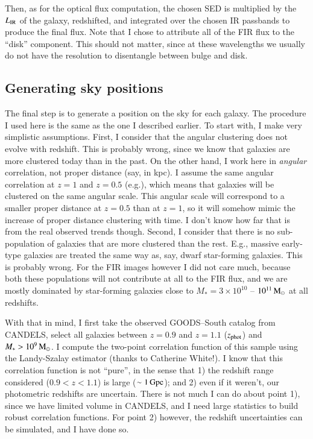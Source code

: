 \documentclass[12pt,a4paper]{article}
\newcommand{\lir}{L_{\rm IR}}
\newcommand{\msun}{{\rm M}_\odot}
\newcommand{\mstar}{M_\ast}
\begin{document}
Then, as for the optical flux computation, the chosen SED is multiplied by the $\lir$ of the galaxy, redshifted, and integrated over the chosen IR passbands to produce the final flux. Note that I chose to attribute all of the FIR flux to the ``disk'' component. This should not matter, since at these wavelengths we usually do not have the resolution to disentangle between bulge and disk.


\subsection{Generating sky positions}

The final step is to generate a position on the sky for each galaxy. The procedure I used here is the same as the one I described earlier. To start with, I make very simplistic assumptions. First, I consider that the angular clustering does not evolve with redshift. This is probably wrong, since we know that galaxies are more clustered today than in the past. On the other hand, I work here in \emph{angular} correlation, not proper distance (say, in kpc). I assume the same angular correlation at $z=1$ and $z=0.5$ (e.g.), which means that galaxies will be clustered on the same angular scale. This angular scale will correspond to a smaller proper distance at $z=0.5$ than at $z=1$, so it will somehow mimic the increase of proper distance clustering with time. I don't know how far that is from the real observed trends though. Second, I consider that there is no sub-population of galaxies that are more clustered than the rest. E.g., massive early-type galaxies are treated the same way as, say, dwarf star-forming galaxies. This is probably wrong. For the FIR images however I did not care much, because both these populations will not contribute at all to the FIR flux, and we are mostly dominated by star-forming galaxies close to $\mstar = 3\times10^{10}$ -- $10^{11}\,\msun$ at all redshifts.

With that in mind, I first take the observed GOODS--South catalog from CANDELS, select all galaxies between $z=0.9$ and $z=1.1$ ($z_{\rm phot}$) and $\mstar > 10^9\,\msun$. I compute the two-point correlation function of this sample using the Landy-Szalay estimator (thanks to Catherine White!). I know that this correlation function is not ``pure'', in the sense that 1) the redshift range considered ($0.9 < z < 1.1$) is large ($\sim1\,{\rm Gpc}$); and 2) even if it weren't, our photometric redshifts are uncertain. There is not much I can do about point 1), since we have limited volume in CANDELS, and I need large statistics to build robust correlation functions. For point 2) however, the redshift uncertainties can be simulated, and I have done so.
\end{document}
